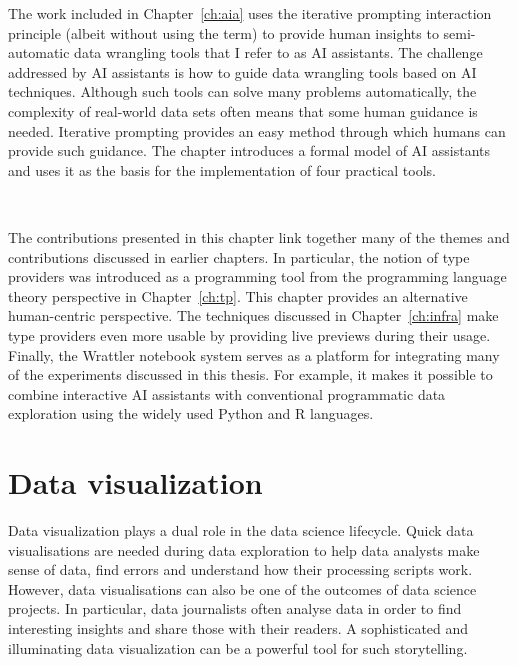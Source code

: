 \documentclass[fleqn,11pt]{report}
\theoremstyle{definition}
\begin{document}
The work included in Chapter~\ref{ch:aia} uses the iterative prompting interaction principle
(albeit without using the term) to provide human insights to semi-automatic data wrangling
tools that I refer to as AI assistants. The challenge addressed by AI assistants is how to
guide data wrangling tools based on AI techniques. Although such tools can solve many problems
automatically, the complexity of real-world data sets often means that some human guidance
is needed. Iterative prompting provides an easy method through which humans can provide such
guidance. The chapter introduces a formal model of AI assistants and uses it as the basis for
the implementation of four practical tools.

~

The contributions presented in this chapter link together many of the themes and contributions
discussed in earlier chapters. In particular, the notion of type providers was introduced
as a programming tool from the programming language theory perspective in Chapter~\ref{ch:tp}.
This chapter provides an alternative human-centric perspective. The techniques discussed
in Chapter~\ref{ch:infra} make type providers even more usable by providing live previews during
their usage. Finally, the Wrattler notebook system serves as a platform for integrating
many of the experiments discussed in this thesis. For example, it makes it possible to combine
interactive AI assistants with conventional programmatic data exploration using the widely
used Python and R languages.



\chapter{Data visualization}

Data visualization plays a dual role in the data science lifecycle. Quick data
visualisations are needed during data exploration to help data analysts make sense of
data, find errors and understand how their processing scripts work. However, data visualisations
can also be one of the outcomes of data science projects. In particular, data journalists
often analyse data in order to find interesting insights and share those with their readers.
A sophisticated and illuminating data visualization can be a powerful tool for such storytelling.
\end{document}
